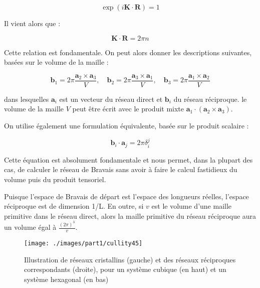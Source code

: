 \begin{equation}
\exp(i \mathbf{K}\cdot \mathbf{R}) = 1
\label{eq:defresreciproque}
\end{equation}

Il vient alors que :

\begin{equation}
    \mathbf{K} \cdot \mathbf{R} = 2 \pi n
    \label{eq:fondreseaurec}
\end{equation}

Cette relation est fondamentale. On peut alors donner les descriptions suivantes, basées sur le volume de la
maille :

\begin{equation}
\mathbf{b}_1 = 2\pi \frac{\mathbf{a}_2 \times \mathbf{a}_3}{V},\quad
\mathbf{b}_2 = 2\pi \frac{\mathbf{a}_3 \times \mathbf{a}_1}{V},\quad
\mathbf{b}_3 = 2\pi \frac{\mathbf{a}_1 \times \mathbf{a}_2}{V}
\end{equation}

dans lesquelles $\mathbf{a}_i$ est un vecteur du réseau direct et $\mathbf{b}_i$ du réseau réciproque. le volume de la maille $V$ peut être écrit avec le produit mixte $\mathbf{a}_1 \cdot (\mathbf{a}_2 \times \mathbf{a}_3)$.

On utilise également une formulation équivalente, basée sur le produit scalaire :

\begin{equation}
\mathbf{b}_i \cdot \mathbf{a}_j = 2\pi \delta_i^j
\label{eq:reseaureciproque}
\end{equation}

Cette équation est absolument fondamentale et nous permet, dans la plupart des cas, de calculer le réseau de Bravais sans avoir à faire le calcul fastidieux du volume puis du produit tensoriel.

Puisque l'espace de Bravais de départ est l'espace des longueurs réelles, l'espace réciproque est de dimension 1/L. En outre, si $v$ est le volume d'une maille primitive dans le réseau direct, alors la maille primitive du réseau réciproque aura un volume égal à $\frac{(2\pi)^3}{v}$.

\begin{figure}
    \texttt{[image: ./images/part1/cullity45]}
    \caption{Illustration de réseaux cristallins (gauche) et des réseaux
        réciproques correspondants (droite), pour un système cubique (en haut) et
    un système hexagonal (en bas)}
    \label{fig:reciprocal}
\end{figure}

